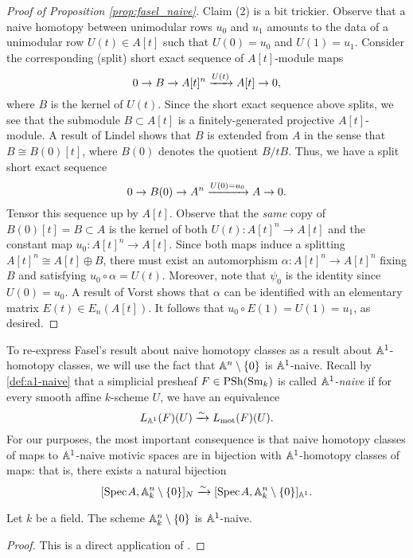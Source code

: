 \begin{proof}[Proof of Proposition \ref{prop:fasel_naive}]
    Claim (2) is a bit trickier. Observe that a naive homotopy between unimodular rows $u_0$ and $u_1$ amounts to the data of a unimodular row $U(t) \in A[t]$ such that $U(0) = u_0$ and $U(1) = u_1$. Consider the corresponding (split) short exact sequence of $A[t]$-module maps
    \[
    0 \to B \to A[t]^n \xrightarrow{U(t)} A[t] \to 0,
    \]
    where $B$ is the kernel of $U(t)$. Since the short exact sequence above splits, we see that the submodule $B \subset A[t]$ is a finitely-generated projective $A[t]$-module. A result of Lindel \cite[Lemma 3]{Lindel82} shows that $B$ is extended from $A$ in the sense that $B \cong B(0)[t]$, where $B(0)$ denotes the quotient $B/tB$. Thus, we have a split short exact sequence
    \[
    0 \to B(0) \to A^n \xrightarrow{U(0) = u_0} A \to 0.
    \]
    Tensor this sequence up by $A[t]$. Observe that the \textit{same} copy of $B(0)[t] = B \subset A$ is the kernel of both $U(t)\colon A[t]^n \to A[t]$ and the constant map $u_0\colon A[t]^n \to A[t]$. Since both maps induce a splitting $A[t]^n \cong A[t] \oplus B$, there must exist an automorphism $\alpha\colon A[t]^n \to A[t]^n$ fixing $B$ and satisfying $u_0 \circ \alpha = U(t)$. Moreover, note that $\psi_0$ is the identity since $U(0) = u_0$. A result of Vorst \cite{Vorst} shows that $\alpha$ can be identified with an elementary matrix $E(t) \in E_n(A[t])$. It follows that $u_0 \circ E(1) = U(1) = u_1$, as desired.
\end{proof}

To re-express Fasel's result about naive homotopy classes as a result about $\mathbb{A}^1$-homotopy classes, we will use the fact that $\mathbb{A}^n \setminus \{0\}$ is $\mathbb{A}^1$-naive. Recall by \autoref{def:a1-naive} that a simplicial presheaf $F \in \mathrm{PSh}(\mathrm{Sm}_k)$ is called \textit{$\mathbb{A}^1$-naive} if for every smooth affine $k$-scheme $U$, we have an equivalence
\[
L_{\mathbb{A}^1}(F)(U) \xrightarrow{\sim} L_{\operatorname{mot}}(F)(U).
\]
For our purposes, the most important consequence is that naive homotopy classes of maps to $\mathbb{A}^1$-naive motivic spaces are in bijection with $\mathbb{A}^1$-homotopy classes of maps: that is, there exists a natural bijection
\[
[\text{Spec}\hspace{0.1em} A, \mathbb{A}^n_k\setminus \{0\}]_{N} \xrightarrow{\sim} [\text{Spec}\hspace{0.1em} A, \mathbb{A}^n_k\setminus \{0\}]_{\mathbb{A}^1}.
\]

\begin{lemma}
    Let $k$ be a field. The scheme $\mathbb{A}^n_k \setminus \{0\}$ is $\mathbb{A}^1$-naive.
\end{lemma}

\begin{proof}
    This is a direct application of \cite[Corollary 4.2.6]{AHW2}.
\end{proof}

